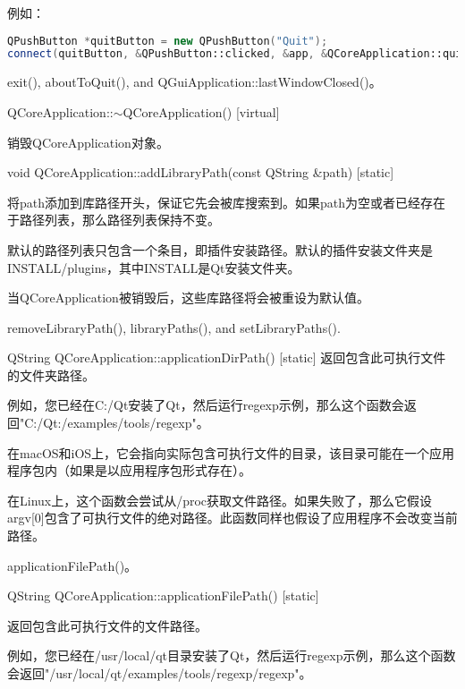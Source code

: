 例如：

\begin{lstlisting}[language=C++]
QPushButton *quitButton = new QPushButton("Quit");
connect(quitButton, &QPushButton::clicked, &app, &QCoreApplication::quit, Qt::QueuedConnection);
\end{lstlisting}

\begin{notice}[另请参阅]
exit(), aboutToQuit(), and QGuiApplication::lastWindowClosed()。
\end{notice}


QCoreApplication::$\sim$QCoreApplication() [virtual]

销毁QCoreApplication对象。

void QCoreApplication::addLibraryPath(const QString \&path) [static]

将path添加到库路径开头，保证它先会被库搜索到。如果path为空或者已经存在于路径列表，那么路径列表保持不变。

默认的路径列表只包含一个条目，即插件安装路径。默认的插件安装文件夹是INSTALL/plugins，其中INSTALL是Qt安装文件夹。

当QCoreApplication被销毁后，这些库路径将会被重设为默认值。

\begin{notice}[另请参阅]
removeLibraryPath(), libraryPaths(), and setLibraryPaths().
\end{notice}

QString QCoreApplication::applicationDirPath() [static]
返回包含此可执行文件的文件夹路径。

例如，您已经在C:/Qt安装了Qt，然后运行regexp示例，那么这个函数会返回"C:/Qt:/examples/tools/regexp"。

在macOS和iOS上，它会指向实际包含可执行文件的目录，该目录可能在一个应用程序包内（如果是以应用程序包形式存在）。

\begin{notice}[警告]
在Linux上，这个函数会尝试从/proc获取文件路径。如果失败了，那么它假设argv[0]包含了可执行文件的绝对路径。此函数同样也假设了应用程序不会改变当前路径。
\end{notice}


\begin{notice}[另请参阅]
applicationFilePath()。
\end{notice}


QString QCoreApplication::applicationFilePath() [static]

返回包含此可执行文件的文件路径。

例如，您已经在/usr/local/qt目录安装了Qt，然后运行regexp示例，那么这个函数会返回"/usr/local/qt/examples/tools/regexp/regexp"。


